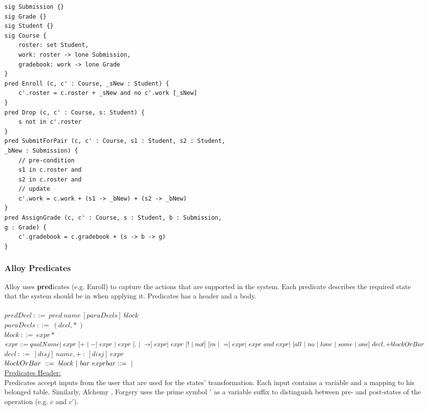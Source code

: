 \documentclass[oneside]{book}
\begin{document}
\begin{lstlisting}
sig Submission {}
sig Grade {}
sig Student {}
sig Course {
	roster: set Student,
	work: roster -> lone Submission,
	gradebook: work -> lone Grade
}
pred Enroll (c, c' : Course, _sNew : Student) {
	c'.roster = c.roster + _sNew and no c'.work [_sNew]
}
pred Drop (c, c' : Course, s: Student) {
	s not in c'.roster 
}
pred SubmitForPair (c, c' : Course, s1 : Student, s2 : Student, 
_bNew : Submission) {
	// pre-condition
	s1 in c.roster and
	s2 in c.roster and
	// update
	c'.work = c.work + (s1 -> _bNew) + (s2 -> _bNew)
}
pred AssignGrade (c, c' : Course, s : Student, b : Submission, 
g : Grade) {
	c'.gradebook = c.gradebook + (s -> b -> g)
}
\end{lstlisting}

\newpage

\subsubsection{Alloy Predicates}

\noindent Alloy uses \textbf{pred}icates (e.g. Enroll) to capture the actions that are supported in the system. Each predicate describes the required state that the system should be in when applying it. Predicates has a header and a body. \\\\
$predDecl\ ::=\ pred\ name\ [paraDecls]\ block$\\
$paraDecls\ ::=\ ( decl,*\ )$\\
$block\ ::=\ { expr* }$\\
$expr ::= qualName\\
|\ expr\ [+\ |\ -]\ expr\ |\ expr\ [.\ |\ \rightarrow]\ expr \\
|\ expr\ [!\ |\ not]\ [in\ |\ =]\ expr\\
|\ expr\ and\ expr\\
|\ [all\ |\ no\ |\ lone\ |\ some\ |\ one]\ decl,+ blockOrBar$\\
$decl\ ::=\ [disj]\ name,+\ :\ [disj]\ expr$\\
$blockOrBar\ ::=\ block\ |\ bar\ expr\\
bar ::=\ |$\\

\noindent\underline{Predicates Header:}\\

\noindent Predicates accept inputs from the user that are used for the states' transformation. Each input contains a variable and a mapping to his belonged table. Similarly, Alchemy \cite{alchemy}, Forgery uses the prime symbol $'$ as a variable suffix to distinguish between pre- and post-states of the operation (e.g. $c$ and $c'$).\\
\end{document}

